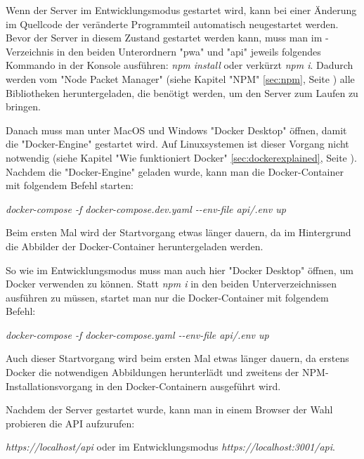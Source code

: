 
Wenn der Server im Entwicklungsmodus gestartet wird, kann bei einer Änderung im Quellcode der veränderte Programmteil automatisch neugestartet werden. Bevor der Server in diesem Zustand gestartet werden kann, muss man im \ZELIA-Verzeichnis in den beiden Unterordnern "pwa" und "api" jeweils folgendes Kommando in der Konsole ausführen: \emph{npm install} oder verkürzt \emph{npm i}. Dadurch werden vom "Node Packet Manager" (siehe Kapitel "NPM" \ref{sec:npm}, Seite \pageref{sec:npm}) alle Bibliotheken heruntergeladen, die benötigt werden, um den Server zum Laufen zu bringen.

Danach muss man unter MacOS und Windows "Docker Desktop" öffnen, damit die "Docker-Engine" gestartet wird. Auf Linuxsystemen ist dieser Vorgang nicht notwendig (siehe Kapitel "Wie funktioniert Docker" \ref{sec:dockerexplained}, Seite \pageref{sec:dockerexplained}). Nachdem die "Docker-Engine" geladen wurde, kann man die Docker-Container mit folgendem Befehl starten:

\emph{docker-compose -f docker-compose.dev.yaml -{}-env-file api/.env up}  

Beim ersten Mal wird der Startvorgang etwas länger dauern, da im Hintergrund die Abbilder der Docker-Container heruntergeladen werden.


So wie im Entwicklungsmodus muss man auch hier "Docker Desktop" öffnen, um Docker verwenden zu können. Statt \emph{npm i} in den beiden Unterverzeichnissen ausführen zu müssen, startet man nur die Docker-Container mit folgendem Befehl:

\emph{docker-compose -f docker-compose.yaml -{}-env-file api/.env up}

Auch dieser Startvorgang wird beim ersten Mal etwas länger dauern, da erstens Docker die notwendigen Abbildungen herunterlädt und zweitens der NPM-Installationsvorgang in den Docker-Containern ausgeführt wird.

Nachdem der Server gestartet wurde, kann man in einem Browser der Wahl probieren die API aufzurufen:

\emph{https://localhost/api} oder im Entwicklungsmodus \emph{https://localhost:3001/api}.